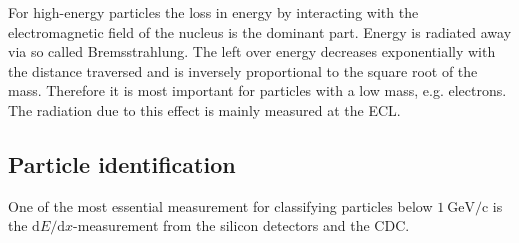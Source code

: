 For high-energy particles the loss in energy by interacting with the electromagnetic field of the nucleus is the dominant part. Energy is radiated away via so called Bremsstrahlung. The left over energy decreases exponentially with the distance traversed and is inversely proportional to the square root of the mass. Therefore it is most important for particles with a low mass, e.g. electrons.
The radiation due to this effect is mainly measured at the ECL.

\subsection{Particle identification}
\label{subsec:particle_identification}

One of the most essential measurement for classifying particles below $1 \mathrm{~GeV/c}$ is the $\mathrm{d}E/\mathrm{d}x$-measurement from the silicon detectors and the CDC.
